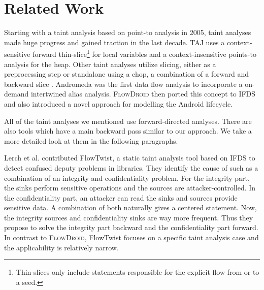 \documentclass[../draft.tex]{subfiles}
\begin{document}
    \chapter{Related Work}
    Starting with a taint analysis based on point-to analysis \cite{Livshits2005} in 2005, taint analyses made huge progress and gained traction in the last decade.
    TAJ\cite{Tripp2009} uses a context-sensitive forward thin-slice\footnote{Thin-slices only include statements responsible for the explicit flow from or to a seed.} for local variables and a context-insensitive points-to analysis for the heap.
    Other taint analyses utilize slicing, either as a preprocessing step \cite{} or standalone using a chop, a combination of a forward and backward slice \cite{Titze2015}.
    Andromeda\cite{Tripp2013} was the first data flow analysis to incorporate a on-demand intertwined alias analysis.
    \textsc{FlowDroid}\cite{Arzt2014} then ported this concept to IFDS and also introduced a novel approach for modelling the Android lifecycle.

    All of the taint analyses we mentioned use forward-directed analyses.
    There are also tools which have a main backward pass similar to our approach. We take a more detailed look at them in the following paragraphs.

    Lerch et al.\cite{Lerch2014} contributed FlowTwist, a static taint analysis tool based on IFDS to detect confused deputy problems\footnotemark{} in libraries.
    They identify the cause of such as a combination of an integrity and confidentiality problem.
    For the integrity part, the sinks perform sensitive operations and the sources are attacker-controlled.
    In the confidentiality part, an attacker can read the sinks and sources provide sensitive data.
    A combination of both naturally gives a centered statement.
    Now, the integrity sources and confidentiality sinks are way more frequent.
    Thus they propose to solve the integrity part backward and the confidentiality part forward.
    In contrast to \textsc{FlowDroid}, FlowTwist focuses on a specific taint analysis case and the applicability is relatively narrow.
\end{document}

